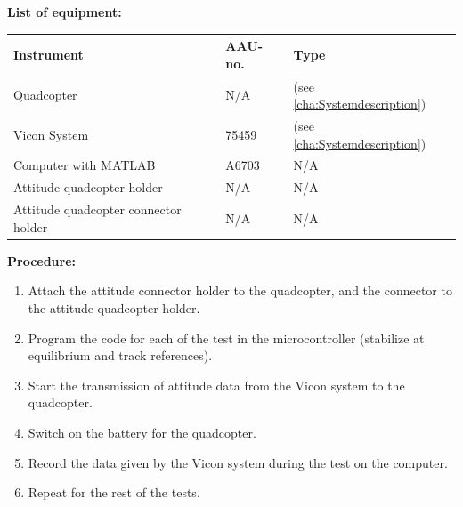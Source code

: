 \textbf{List of equipment:}	

\begin{table}[H]
	\begin{tabular}{|l|l|p{4.3cm}|}
		\hline%
		\textbf{Instrument}   &  \textbf{AAU-no.}  &  \textbf{Type}                       \\
		\hline%
		Quadcopter    	&  N/A 						&  (see \autoref{cha:Systemdescription}) 		      	 \\
		\hline%
	    Vicon System			& 75459                 &  (see \autoref{cha:Systemdescription})                  \\
		\hline%
		Computer with MATLAB       &  A6703		 & N/A     \\
		\hline%
		Attitude quadcopter holder      &  N/A		 & N/A     \\
		\hline%
		Attitude quadcopter connector holder   &  N/A		 & N/A     \\
		\hline%
	\end{tabular}
\end{table}
	
\textbf{Procedure:}

\begin{enumerate}
	\item Attach the attitude connector holder to the quadcopter, and the connector to the attitude quadcopter holder.
    \item Program the code for each of the test in the microcontroller (stabilize at equilibrium and track references).
	\item Start the transmission of attitude data from the Vicon system to the quadcopter.
	\item Switch on the battery for the quadcopter.
	\item Record the data given by the Vicon system during the test on the computer.
    \item Repeat for the rest of the tests.
\end{enumerate}
 
